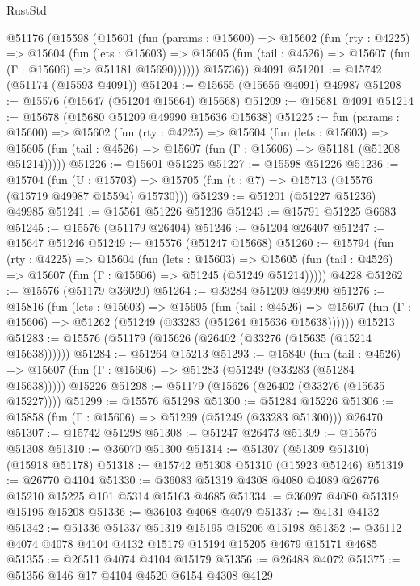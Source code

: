 \begin{lexlean}{RustStd}
\begin{coremodule}
    @51176
      (@15598
        (@15601
          (fun (params : @15600) =>
          @15602
            (fun (rty : @4225) =>
            @15604
              (fun (lets : @15603) =>
              @15605 (fun (tail : @4526) => @15607 (fun (Γ : @15606) => @51181 @15690))))))
        @15736))
    @4091
@51201 := @15742 (@51174 (@15593 @4091))
@51204 := @15655 (@15656 @4091) @49987
@51208 := @15576 (@15647 (@51204 @15664) @15668)
@51209 := @15681 @4091
@51214 := @15678 (@15680 @51209 @49990 @15636 @15638)
@51225 := fun (params : @15600) =>
  @15602
    (fun (rty : @4225) =>
    @15604
      (fun (lets : @15603) =>
      @15605 (fun (tail : @4526) => @15607 (fun (Γ : @15606) => @51181 (@51208 @51214)))))
@51226 := @15601 @51225
@51227 := @15598 @51226
@51236 := @15704
    (fun (U : @15703) => @15705 (fun (t : @7) => @15713 (@15576 (@15719 @49987 @15594) @15730)))
@51239 := @51201 (@51227 @51236) @49985
@51241 := @15561 @51226 @51236
@51243 := @15791 @51225 @6683
@51245 := @15576 (@51179 @26404)
@51246 := @51204 @26407
@51247 := @15647 @51246
@51249 := @15576 (@51247 @15668)
@51260 := @15794
    (fun (rty : @4225) =>
    @15604
      (fun (lets : @15603) =>
      @15605 (fun (tail : @4526) => @15607 (fun (Γ : @15606) => @51245 (@51249 @51214)))))
    @4228
@51262 := @15576 (@51179 @36020)
@51264 := @33284 @51209 @49990
@51276 := @15816
    (fun (lets : @15603) =>
    @15605
      (fun (tail : @4526) =>
      @15607 (fun (Γ : @15606) => @51262 (@51249 (@33283 (@51264 @15636 @15638))))))
    @15213
@51283 := @15576 (@51179 (@15626 (@26402 (@33276 (@15635 (@15214 @15638))))))
@51284 := @51264 @15213
@51293 := @15840
    (fun (tail : @4526) => @15607 (fun (Γ : @15606) => @51283 (@51249 (@33283 (@51284 @15638)))))
    @15226
@51298 := @51179 (@15626 (@26402 (@33276 (@15635 @15227))))
@51299 := @15576 @51298
@51300 := @51284 @15226
@51306 := @15858 (fun (Γ : @15606) => @51299 (@51249 (@33283 @51300))) @26470
@51307 := @15742 @51298
@51308 := @51247 @26473
@51309 := @15576 @51308
@51310 := @36070 @51300
@51314 := @51307 (@51309 @51310) (@15918 @51178)
@51318 := @15742 @51308 @51310 (@15923 @51246)
@51319 := @26770 @4104
@51330 := @36083 @51319 @4308 @4080 @4089 @26776 @15210 @15225 @101 @5314 @15163 @4685
@51334 := @36097 @4080 @51319 @15195 @15208
@51336 := @36103 @4068 @4079
@51337 := @4131 @4132
@51342 := @51336 @51337 @51319 @15195 @15206 @15198
@51352 := @36112 @4074 @4078 @4104 @4132 @15179 @15194 @15205 @4679 @15171 @4685
@51355 := @26511 @4074 @4104 @15179
@51356 := @26488 @4072
@51375 := @51356
    @146
    @17
    @4104
    @4520
    @6154
    @4308
    @4129

\end{coremodule}
\end{lexlean}
